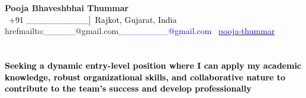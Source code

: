 \documentclass[a4paper,10pt]{article}
\begin{document}
\pagestyle{empty}

\begin{center}
    {\Huge \textbf{Pooja Bhaveshbhai Thummar}}\\
    \vspace{2mm}
    \textcolor{black}{\ +91 __________]\ Rajkot, Gujarat, India} \\
    href{mailto:_____@gmail.com}{\textcolor{blue}{________@gmail.com}}
    \textcolor{black}{\faLinkedinIn\ \href{https://www.linkedin.com/in/pooja-thummar-b903a2289}{\textcolor{blue}{pooja-thummar}}}
\end{center}

\section*{}
\textcolor{black}{\textbf{Seeking a dynamic entry-level position where I can apply my academic knowledge, robust organizational skills, and collaborative nature to contribute to the team's success and develop professionally}}
\end{document}
